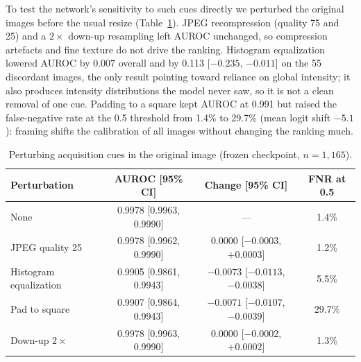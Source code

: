 To test the network's sensitivity to such cues directly we perturbed the original images before the usual
resize (Table~\ref{tab:cue-perturbation}). JPEG recompression (quality 75 and 25) and a $2\times$ down-up
resampling left AUROC unchanged, so compression artefacts and fine texture do not drive the ranking. Histogram
equalization lowered AUROC by 0.007 overall and by 0.113 [$-0.235$, $-0.011$] on the 55 discordant images,
the only result pointing toward reliance on global intensity; it also produces intensity distributions the
model never saw, so it is not a clean removal of one cue. Padding to a square kept AUROC at 0.991 but raised
the false-negative rate at the 0.5 threshold from 1.4\% to 29.7\% (mean logit shift $-5.1$): framing shifts
the calibration of all images without changing the ranking much.

\begin{table}[htbp]
\centering
\caption{Perturbing acquisition cues in the original image (frozen checkpoint, $n=1{,}165$).}
\label{tab:cue-perturbation}
\small
\begin{tabular}{lccc}
\toprule
Perturbation & AUROC [95\% CI] & Change [95\% CI] & FNR at 0.5 \\
\midrule
None & 0.9978 [0.9963, 0.9990] & --- & 1.4\% \\
JPEG quality 25 & 0.9978 [0.9962, 0.9990] & $0.0000$ [$-0.0003$, $+0.0003$] & 1.2\% \\
Histogram equalization & 0.9905 [0.9861, 0.9943] & $-0.0073$ [$-0.0113$, $-0.0038$] & 5.5\% \\
Pad to square & 0.9907 [0.9864, 0.9943] & $-0.0071$ [$-0.0107$, $-0.0039$] & 29.7\% \\
Down-up $2\times$ & 0.9978 [0.9963, 0.9990] & $0.0000$ [$-0.0002$, $+0.0002$] & 1.3\% \\
\bottomrule
\end{tabular}
\end{table}

